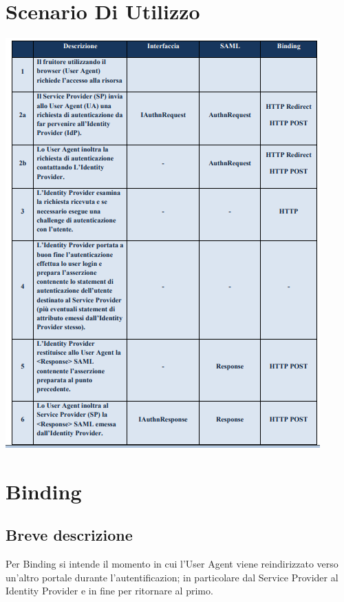 \section{Scenario Di Utilizzo}
\begin{center}
	\includegraphics[scale = 1]{./res/images/ScenarioUsoSPID.PNG}
\end{center}

\pagebreak
\section{Binding}
\subsection{Breve descrizione}
Per Binding si intende il momento in cui l'User Agent viene reindirizzato verso un'altro portale durante l'autentificazion;
in particolare dal Service Provider al Identity Provider e in fine per ritornare al primo.
